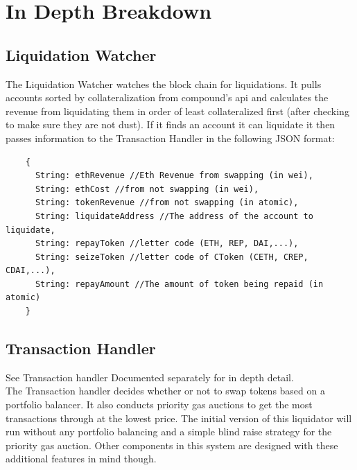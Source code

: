 \documentclass{article}
\begin{document}
\section*{In Depth Breakdown}
  \subsection*{Liquidation Watcher}
  The Liquidation Watcher watches the block chain for liquidations. It pulls accounts sorted by collateralization from compound's api and calculates the revenue
  from liquidating them in order of least collateralized first (after checking to make sure they are not dust). If it finds an account it can liquidate it then passes
  information to the Transaction Handler in the following JSON format:
  \begin{verbatim}
    {
      String: ethRevenue //Eth Revenue from swapping (in wei),
      String: ethCost //from not swapping (in wei),
      String: tokenRevenue //from not swapping (in atomic),
      String: liquidateAddress //The address of the account to liquidate,
      String: repayToken //letter code (ETH, REP, DAI,...),
      String: seizeToken //letter code of CToken (CETH, CREP, CDAI,...),
      String: repayAmount //The amount of token being repaid (in atomic)
    }
  \end{verbatim}
  \subsection*{Transaction Handler}
  See Transaction handler Documented separately for in depth detail.
  \\
  The Transaction handler decides whether or not to swap tokens based on a portfolio balancer. It also conducts priority gas auctions to
  get the most transactions through at the lowest price. The initial version of this liquidator will run without any portfolio balancing and a
  simple blind raise strategy for the priority gas auction. Other components in this system are designed with these additional features in mind though.
  \pagebreak
\end{document}
